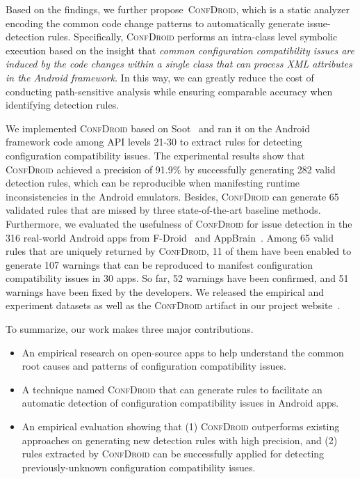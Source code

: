 Based on the findings, we further propose~\textsc{ConfDroid}, which is a static analyzer encoding the common code change patterns to automatically generate issue-detection rules.
Specifically, \textsc{ConfDroid} performs an intra-class level symbolic execution based on the insight that \textit{common configuration compatibility issues are induced by the code changes within a single class that can process XML attributes in the Android framework}.
In this way, we can greatly reduce the cost of conducting path-sensitive analysis while ensuring comparable accuracy when identifying detection rules.

We implemented \textsc{ConfDroid} based on Soot~\cite{lam2011soot} and ran it on the Android framework code among API levels 21-30 to extract rules for detecting configuration compatibility issues.
The experimental results show that \textsc{ConfDroid} achieved a precision of 91.9\% by successfully generating 282 valid detection rules, which can be reproducible when manifesting runtime inconsistencies in the Android emulators.
Besides, \textsc{ConfDroid} can generate 65 validated rules that are missed by three state-of-the-art baseline methods.
Furthermore, we evaluated the usefulness of \textsc{ConfDroid} for issue detection in the 316 real-world Android apps from F-Droid~\cite{fdroid} and AppBrain~\cite{appbrain}.
Among 65 valid rules that are uniquely returned by \textsc{ConfDroid}, 11 of them have been enabled to generate 107 warnings that can be reproduced to manifest configuration compatibility issues in 30 apps.
So far, 52 warnings have been confirmed, and 51 warnings have been fixed by the developers.
We released the empirical and experiment datasets as well as the \textsc{ConfDroid} artifact in our project website~\cite{confdroid}.

To summarize, our work makes three major contributions.
\begin{itemize}
	\item An empirical research on open-source apps to help understand the common root causes and patterns of configuration compatibility issues.
	\item A technique named \textsc{ConfDroid} that can generate rules to facilitate an automatic detection of configuration compatibility issues in Android apps.
	\item An empirical evaluation showing that (1) \textsc{ConfDroid} outperforms existing approaches on generating new detection rules with high precision, and (2) rules extracted by \textsc{ConfDroid} can be successfully applied for detecting previously-unknown configuration compatibility issues.
\end{itemize}


{\Huge }